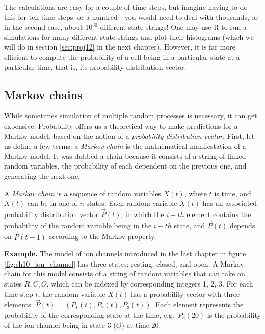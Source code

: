 \documentclass[
  letterpaper,
  DIV=11,
  numbers=noendperiod]{scrreprt}
\begin{document}
The calculations are easy for a couple of time steps, but imagine having
to do this for ten time steps, or a hundred - you would need to deal
with thousands, or in the second case, about \(10^{30}\) different state
strings! One may use R to run a simulations for many different state
strings and plot their histograms (which we will do in section
\ref{sec:proj12} in the next chapter). However, it is far more efficient
to compute the probability of a cell being in a particular state at a
particular time, that is, its probability distribution vector.

\hypertarget{markov-chains}{%
\subsection{Markov chains}\label{markov-chains}}

While sometimes simulation of multiple random processes is necessary, it
can get expensive. Probability offers us a theoretical way to make
predictions for a Markov model, based on the notion of a
\emph{probability distribution vector}. First, let us define a few
terms: a \emph{Markov chain} is the mathematical manifestation of a
Markov model. It was dubbed a chain because it consists of a string of
linked random variables, the probability of each dependent on the
previous one, and generating the next one.

\begin{tcolorbox}[enhanced jigsaw, arc=.35mm, colframe=quarto-callout-note-color-frame, left=2mm, opacitybacktitle=0.6, breakable, title=\textcolor{quarto-callout-note-color}{\faInfo}\hspace{0.5em}{Definition}, toprule=.15mm, coltitle=black, bottomtitle=1mm, toptitle=1mm, colback=white, leftrule=.75mm, colbacktitle=quarto-callout-note-color!10!white, titlerule=0mm, opacityback=0, rightrule=.15mm, bottomrule=.15mm]

A \emph{Markov chain} is a sequence of random variables \(X(t)\), where
\(t\) is time, and \(X(t)\) can be in one of \(n\) states. Each random
variable \(X(t)\) has an associated probability distribution vector
\(\vec P(t)\), in which the \(i-th\) element contains the probability of
the random variable being in the \(i-th\) state, and \(\vec P(t)\)
depends on \(\vec P(t-1)\) according to the Markov property.

\end{tcolorbox}

\textbf{Example.} The model of ion channels introduced in the last
chapter in figure \ref{fig:ch10_ion_channel} has three states: resting,
closed, and open. A Markov chain for this model consists of a string of
random variables that can take on states \(R, C, O\), which can be
indexed by corresponding integers 1, 2, 3. For each time step \(t\), the
random variable \(X(t)\) has a probability vector with three elements:
\(\vec P(t) = (P_1(t), P_2(t), P_3(t))\). Each element represents the
probability of the corresponding state at the time, e.g.~\(P_3(20)\) is
the probability of the ion channel being in state 3 (\(O\)) at time 20.
\end{document}
